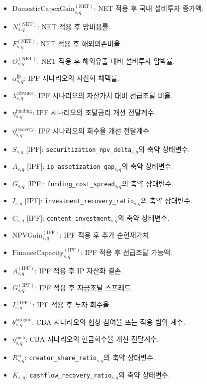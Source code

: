 \documentclass[11pt,a4paper]{report}
\begin{document}
\begin{itemize}[leftmargin=1.8em,itemsep=0.35em]
\item \(\mathrm{DomesticCapexGain}^{(\mathrm{NET})}_{s,q}\): NET 적용 후 국내 설비투자 증가액.
\item \(N^{(\mathrm{NET})}_{s,q}\): NET 적용 후 망비용률.
\item \(F^{(\mathrm{NET})}_{s,q}\): NET 적용 후 해외의존비율.
\item \(O^{(\mathrm{NET})}_{s,q}\): NET 적용 후 해외유출 대비 설비투자 압박률.
\item \(\alpha^{\mathrm{ip}}_{s,q}\): IPF 시나리오의 자산화 채택률.
\item \(\lambda^{\mathrm{advance}}_{s,q}\): IPF 시나리오의 자산가치 대비 선급조달 비율.
\item \(\eta^{\mathrm{funding}}_{s,q}\): IPF 시나리오의 조달금리 개선 전달계수.
\item \(\eta^{\mathrm{recovery}}_{s,q}\): IPF 시나리오의 회수율 개선 전달계수.
\item \(S_{s,q}\) [IPF]: \nolinkurl{securitization_npv_delta}\(_{s,q}\)의 축약 상태변수.
\item \(A_{s,q}\) [IPF]: \nolinkurl{ip_assetization_gap}\(_{s,q}\)의 축약 상태변수.
\item \(G_{s,q}\) [IPF]: \nolinkurl{funding_cost_spread}\(_{s,q}\)의 축약 상태변수.
\item \(I_{s,q}\) [IPF]: \nolinkurl{investment_recovery_ratio}\(_{s,q}\)의 축약 상태변수.
\item \(C_{s,q}\) [IPF]: \nolinkurl{content_investment}\(_{s,q}\)의 축약 상태변수.
\item \(\mathrm{NPVGain}^{(\mathrm{IPF})}_{s,q}\): IPF 적용 후 추가 순현재가치.
\item \(\mathrm{FinanceCapacity}^{(\mathrm{IPF})}_{s,q}\): IPF 적용 후 선급조달 가능액.
\item \(A^{(\mathrm{IPF})}_{s,q}\): IPF 적용 후 IP 자산화 결손.
\item \(G^{(\mathrm{IPF})}_{s,q}\): IPF 적용 후 자금조달 스프레드.
\item \(I^{(\mathrm{IPF})}_{s,q}\): IPF 적용 후 투자 회수율.
\item \(\theta^{\mathrm{bargain}}_{s,q}\): CBA 시나리오의 협상 참여율 또는 적용 범위 계수.
\item \(\eta^{\mathrm{cash}}_{s,q}\): CBA 시나리오의 현금회수율 개선 전달계수.
\item \(R^{\mathrm{cr}}_{s,q}\): \nolinkurl{creator_share_ratio}\(_{s,q}\)의 축약 상태변수.
\item \(K_{s,q}\): \nolinkurl{cashflow_recovery_ratio}\(_{s,q}\)의 축약 상태변수.

\end{itemize}
\end{document}
